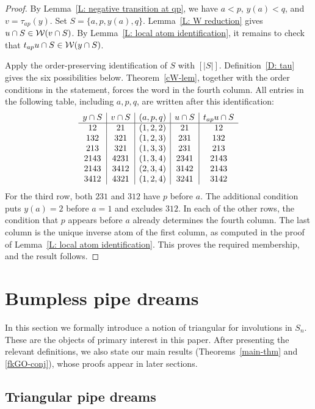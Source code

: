 \documentclass[10pt]{article}
\begin{document}
\begin{proof}
By Lemma~\ref{L: negative transition at qp}, we have $a<p$,
$y(a)<q$, and $v=\tau_{ap}(y)$.
Set $S=\{a,p,y(a),q\}$.
Lemma~\ref{L: W reduction} gives $u\cap S\in\mathcal{W}(v\cap S)$.
By Lemma~\ref{L: local atom identification}, it remains to check that
$t_{ap}u\cap S\in\mathcal{W}(y\cap S)$.

Apply the order-preserving identification of $S$ with $[|S|]$.
Definition~\ref{D: tau} gives the six possibilities below.
Theorem~\ref{cW-lem}, together with the order conditions in the statement,
forces the word in the fourth column.
All entries in the following table, including $a,p,q$, are written after this
identification:
\[
\begin{array}{c|c|c|c|c}
y\cap S & v\cap S & (a,p,q) & u\cap S
& t_{ap}u\cap S \\
\hline
12   & 21   & (1,2,2) & 21   & 12 \\
132  & 321  & (1,2,3) & 231  & 132 \\
213  & 321  & (1,3,3) & 231  & 213 \\
2143 & 4231 & (1,3,4) & 2341 & 2143 \\
2143 & 3412 & (2,3,4) & 3142 & 2143 \\
3412 & 4321 & (1,2,4) & 3241 & 3142
\end{array}
\]
For the third row, both $231$ and $312$ have $p$ before $a$.
The additional condition puts $y(a)=2$ before $a=1$ and excludes $312$.
In each of the other rows, the condition that $p$ appears before $a$
already determines the fourth column.
The last column is the unique inverse atom of the first column,
as computed in the proof of Lemma~\ref{L: local atom identification}.
This proves the required membership, and the result follows.
\end{proof}


\section{Bumpless pipe dreams}\label{bpd-sect}

In this section we formally introduce a notion of triangular 
for involutions in $S_n$. These are the objects of  primary interest in this paper.
After presenting the relevant definitions, we also  state our  main results (Theorems~\ref{main-thm} and \ref{fkGO-conj}), whose proofs appear in later sections.

\subsection{Triangular pipe dreams}
\end{document}
